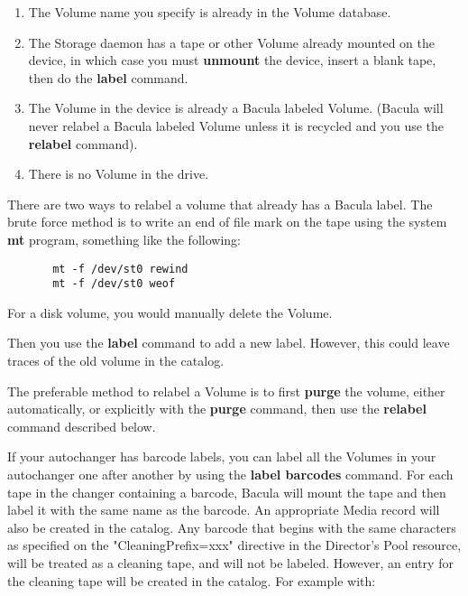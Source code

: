 \begin{description}
\begin{enumerate}
\item The Volume name you specify is already in the  Volume database.  

\item The Storage daemon has a tape or other Volume already mounted on the
   device, in which case you must {\bf unmount} the device, insert a blank
   tape, then do the {\bf label} command.

\item The Volume in the device is already a Bacula labeled Volume.  (Bacula will
   never relabel a Bacula labeled Volume unless it is recycled and you use the
   {\bf relabel} command).  

\item There is no Volume in the drive.  
\end{enumerate}

There are two ways to relabel a volume that already has a Bacula label. The
brute  force method is to write an end of file mark on the tape  using the
system {\bf mt} program, something like the  following:  

\footnotesize
\begin{verbatim}
       mt -f /dev/st0 rewind
       mt -f /dev/st0 weof
\end{verbatim}
\normalsize

For a disk volume, you would manually delete the Volume.

Then you use the {\bf label} command to add a new label.  However, this could
leave traces of the old volume in the  catalog.  

The preferable method to relabel a Volume is to first {\bf purge}  the volume,
either automatically, or explicitly with the  {\bf purge} command, then use
the {\bf relabel} command described  below.  

If your autochanger has barcode labels, you can label all the Volumes in
your autochanger one after another by using the {\bf label barcodes}
command.  For each tape in the changer containing a barcode, Bacula will
mount the tape and then label it with the same name as the barcode.  An
appropriate Media record will also be created in the catalog.  Any barcode
that begins with the same characters as specified on the
"CleaningPrefix=xxx" directive in the Director's Pool resource, will be
treated as a cleaning tape, and will not be labeled.  However, an entry for
the cleaning tape will be created in the catalog.  For example with:


\end{description}
